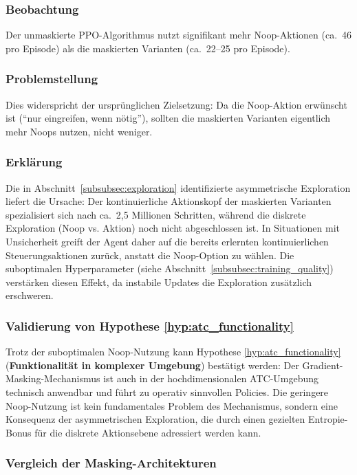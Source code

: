 \subsubsection*{Beobachtung}
Der unmaskierte \ac{PPO}-Algorithmus nutzt signifikant mehr Noop-Aktionen (ca.~46 pro Episode) als die maskierten Varianten (ca.~22--25 pro Episode).

\subsubsection*{Problemstellung}
Dies widerspricht der ursprünglichen Zielsetzung: Da die Noop-Aktion erwünscht ist (\enquote{nur eingreifen, wenn nötig}), sollten die maskierten Varianten eigentlich mehr Noops nutzen, nicht weniger.

\subsubsection*{Erklärung}
Die in Abschnitt~\ref{subsubsec:exploration} identifizierte asymmetrische Exploration liefert die Ursache: Der kontinuierliche Aktionskopf der maskierten Varianten spezialisiert sich nach ca.~2,5 Millionen Schritten, während die diskrete Exploration (Noop vs. Aktion) noch nicht abgeschlossen ist. In Situationen mit Unsicherheit greift der Agent daher auf die bereits erlernten kontinuierlichen Steuerungsaktionen zurück, anstatt die Noop-Option zu wählen. Die suboptimalen Hyperparameter (siehe Abschnitt~\ref{subsubsec:training_quality}) verstärken diesen Effekt, da instabile Updates die Exploration zusätzlich erschweren.

\subsubsection*{Validierung von Hypothese \ref{hyp:atc_functionality}}
Trotz der suboptimalen Noop-Nutzung kann Hypothese \ref{hyp:atc_functionality} (\textbf{Funktionalität in komplexer Umgebung}) bestätigt werden: Der Gradient\hyp{}Masking\hyp{}Mechanismus ist auch in der hochdimensionalen ATC-Umgebung technisch anwendbar und führt zu operativ sinnvollen Policies. Die geringere Noop-Nutzung ist kein fundamentales Problem des Mechanismus, sondern eine Konsequenz der asymmetrischen Exploration, die durch einen gezielten Entropie-Bonus für die diskrete Aktionsebene adressiert werden kann.

\subsubsection{Vergleich der Masking-Architekturen}
\label{subsubsec:architecture_comparison}

